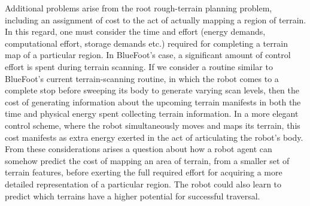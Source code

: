 	Additional problems arise from the root rough-terrain planning problem, including an assignment of cost to the act of actually mapping a region of terrain. In this regard, one must consider the time and effort (energy demands, computational effort, storage demands etc.) required for completing a terrain map of a particular region. In BlueFoot's case, a significant amount of control effort is spent during terrain scanning. If we consider a routine similar to BlueFoot's current terrain-scanning routine, in which the robot comes to a complete stop before sweeping its body to generate varying scan levels, then the cost of generating information about the upcoming terrain  manifests in both the time and physical energy spent collecting terrain information. In a more elegant control scheme, where the robot simultaneously moves and maps its terrain, this cost manifests as extra energy exerted in the act of articulating the robot's body. From these considerations arises a question about how a robot agent can somehow predict the cost of mapping an area of terrain, from a smaller set of terrain features, before exerting the full required effort for acquiring a more detailed representation of a particular region. The robot could also learn to predict which terrains have a higher potential for successful traversal. %